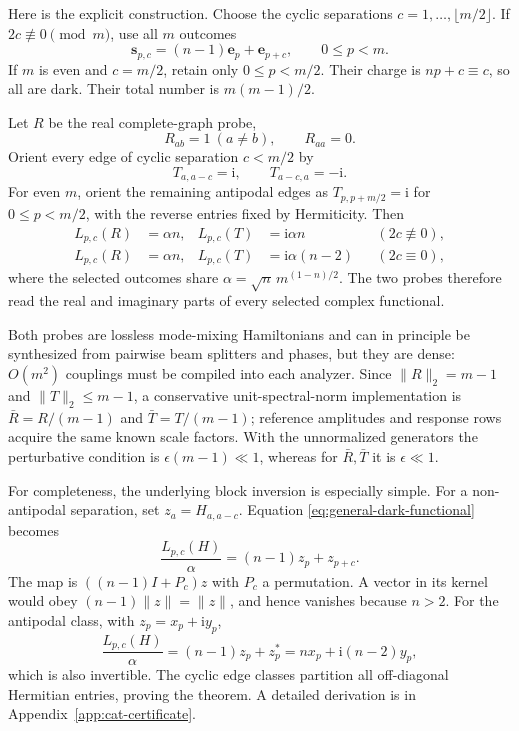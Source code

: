 \documentclass[aps,pra,reprint,amsmath,amssymb,superscriptaddress,longbibliography]{revtex4-2}
\newcommand{\ii}{\mathrm{i}}
\newcommand{\be}{\bm e}
\begin{document}
Here is the explicit construction.  Choose the cyclic separations
$c=1,\ldots,\lfloor m/2\rfloor$.  If $2c\not\equiv0\pmod m$, use all $m$
outcomes
\begin{equation}
 \bm s_{p,c}=(n-1)\be_p+\be_{p+c},\qquad 0\leq p<m.
\label{eq:selected-general-outcomes}
\end{equation}
If $m$ is even and $c=m/2$, retain only $0\leq p<m/2$.  Their charge is
$np+c\equiv c$, so all are dark.  Their total number is
$m(m-1)/2$.

Let $R$ be the real complete-graph probe,
\begin{equation}
 R_{ab}=1\ (a\neq b),\qquad R_{aa}=0.
\end{equation}
Orient every edge of cyclic separation $c<m/2$ by
\begin{equation}
 T_{a,a-c}=\ii,\qquad T_{a-c,a}=-\ii.
\label{eq:oriented-probe}
\end{equation}
For even $m$, orient the remaining antipodal edges as
$T_{p,p+m/2}=\ii$ for $0\leq p<m/2$, with the reverse entries fixed by
Hermiticity.  Then
\begin{align}
 L_{p,c}(R)&=\alpha n,&L_{p,c}(T)&=\ii\alpha n
 &&(2c\not\equiv0),\nonumber\\
 L_{p,c}(R)&=\alpha n,&L_{p,c}(T)&=\ii\alpha(n-2)
 &&(2c\equiv0),
\label{eq:general-reference-values}
\end{align}
where the selected outcomes share
$\alpha=\sqrt n\,m^{(1-n)/2}$.  The two probes therefore read the real and
imaginary parts of every selected complex functional.

Both probes are lossless mode-mixing Hamiltonians and can in principle be
synthesized from pairwise beam splitters and phases, but they are dense:
$O(m^2)$ couplings must be compiled into each analyzer.  Since
$\|R\|_2=m-1$ and $\|T\|_2\leq m-1$, a conservative unit-spectral-norm
implementation is $\bar R=R/(m-1)$ and $\bar T=T/(m-1)$; reference
amplitudes and response rows acquire the same known scale factors.  With
the unnormalized generators the perturbative condition is
$\epsilon(m-1)\ll1$, whereas for $\bar R,\bar T$ it is
$\epsilon\ll1$.

For completeness, the underlying block inversion is especially simple.
For a non-antipodal separation, set $z_a=H_{a,a-c}$.  Equation
\eqref{eq:general-dark-functional} becomes
\begin{equation}
 \frac{L_{p,c}(H)}{\alpha}=(n-1)z_p+z_{p+c}.
\label{eq:cyclic-block}
\end{equation}
The map is $((n-1)I+P_c)z$ with $P_c$ a permutation.  A vector in its
kernel would obey $(n-1)\|z\|=\|z\|$, and hence vanishes because $n>2$.
For the antipodal class, with $z_p=x_p+\ii y_p$,
\begin{equation}
 \frac{L_{p,c}(H)}{\alpha}
 =(n-1)z_p+z_p^*=nx_p+\ii(n-2)y_p,
\label{eq:antipodal-block}
\end{equation}
which is also invertible.  The cyclic edge classes partition all
off-diagonal Hermitian entries, proving the theorem.  A detailed derivation
is in Appendix~\ref{app:cat-certificate}.
\end{document}

